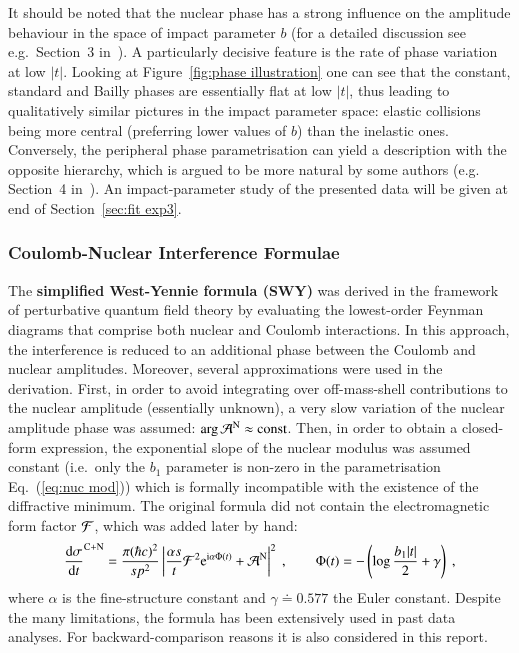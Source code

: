 It should be noted that the nuclear phase has a strong influence on the amplitude behaviour in the space of impact parameter $b$ (for a detailed discussion see e.g.~Section~3 in~\cite{klk02}). A particularly decisive feature is the rate of phase variation at low $|t|$. Looking at Figure~\ref{fig:phase illustration} one can see that the constant, standard and Bailly phases are essentially flat at low $|t|$, thus leading to qualitatively similar pictures in the impact parameter space: elastic collisions being more central (preferring lower values of $b$) than the inelastic ones. Conversely, the peripheral phase parametrisation can yield a description with the opposite hierarchy, which is argued to be more natural by some authors (e.g. Section~4 in~\cite{kl96}). An impact-parameter study of the presented data will be given at end of Section~\ref{sec:fit exp3}.

\subsubsection{Coulomb-Nuclear Interference Formulae}
\label{sec:cni interference}

The {\bf simplified West-Yennie formula (SWY)} \cite{wy68} was derived in the framework of perturbative quantum field theory by evaluating the lowest-order Feynman diagrams that comprise both nuclear and Coulomb interactions. In this approach, the interference is reduced to an additional phase between the Coulomb and nuclear amplitudes. Moreover, several approximations were used in the derivation. First, in order to avoid integrating over off-mass-shell contributions to the nuclear amplitude (essentially unknown), a very slow variation of the nuclear amplitude phase was assumed: $\arg {\cal A}^{\rm N} \approx \hbox{const}$. Then, in order to obtain a closed-form expression, the exponential slope of the nuclear modulus was assumed constant (i.e.~only the $b_1$ parameter is non-zero in the parametrisation Eq.~(\ref{eq:nuc mod})) which is formally incompatible with the existence of the diffractive minimum. The original formula did not contain the electromagnetic form factor ${\cal F}$, which was added later by hand:
\begin{equation}
\label{eq:int swy}
	{\d\sigma\over \d t}^{\rm C+N} = {\pi (\hbar c)^2 \over s p^2} \left | {\alpha s\over t} {\cal F}^2 \e^{\I\alpha \Phi(t)} + {\cal A}^{\rm N} \right |^2\ ,\qquad
	\Phi(t) = - \left( \log {b_1 |t|\over 2} + \gamma \right)\ ,
\end{equation}
where $\alpha$ is the fine-structure constant and $\gamma \doteq 0.577$ the Euler constant. Despite the many limitations, the formula has been extensively used in past data analyses. For backward-comparison reasons it is also considered in this report.

